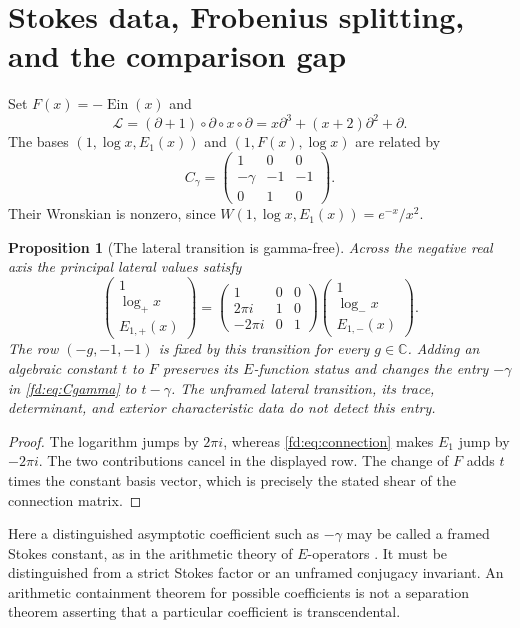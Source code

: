 \documentclass[11pt,a4paper]{article}
\newcommand{\C}{\mathbb C}
\newcommand{\Ein}{\operatorname{Ein}}
\newcommand{\E}{\mathbb E}
\newtheorem{proposition}[theorem]{Proposition}
\theoremstyle{definition}
\theoremstyle{remark}
\numberwithin{equation}{section}
\begin{document}
\section{Stokes data, Frobenius splitting, and the comparison gap}
\label{fd:sec:framing}
Set $F(x)=-\Ein(x)$ and
\[
 \mathcal L=(\partial+1)\circ\partial\circ x\circ\partial
 =x\partial^3+(x+2)\partial^2+\partial.
\]
The bases $(1,\log x,E_1(x))$ and $(1,F(x),\log x)$ are related by
\begin{equation}\label{fd:eq:Cgamma}
 C_\gamma=\begin{pmatrix}1&0&0\\-\gamma&-1&-1\\0&1&0\end{pmatrix}.
\end{equation}
Their Wronskian is nonzero, since
$W(1,\log x,E_1(x))=e^{-x}/x^2$.

\begin{proposition}[The lateral transition is gamma-free]\label{fd:prop:stokes}
Across the negative real axis the principal lateral values satisfy
\[
 \begin{pmatrix}1\\\log_+x\\E_{1,+}(x)\end{pmatrix}
 =\begin{pmatrix}1&0&0\\2\pi i&1&0\\-2\pi i&0&1\end{pmatrix}
 \begin{pmatrix}1\\\log_-x\\E_{1,-}(x)\end{pmatrix}.
\]
The row $(-g,-1,-1)$ is fixed by this transition for every $g\in\C$.
Adding an algebraic constant $t$ to $F$ preserves its $E$-function
status and changes the entry $-\gamma$ in \eqref{fd:eq:Cgamma} to
$t-\gamma$.  The unframed lateral transition, its trace, determinant,
and exterior characteristic data do not detect this entry.
\end{proposition}
\begin{proof}
The logarithm jumps by $2\pi i$, whereas \eqref{fd:eq:connection} makes
$E_1$ jump by $-2\pi i$.  The two contributions cancel in the displayed
row.  The change of $F$ adds $t$ times the constant basis vector, which
is precisely the stated shear of the connection matrix.
\end{proof}

Here a distinguished asymptotic coefficient such as $-\gamma$ may be
called a framed Stokes constant, as in the arithmetic theory of
$E$-operators \cite{pm:FischlerRivoal2016}.  It must be distinguished from a strict
Stokes factor or an unframed conjugacy invariant.  An arithmetic
containment theorem for possible coefficients is not a separation
theorem asserting that a particular coefficient is transcendental.
\end{document}
